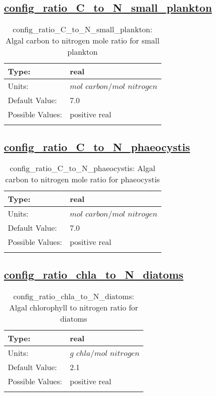 \subsection[config\_ratio\_C\_to\_N\_small\_plankton]{\hyperref[sec:nm_tab_biogeochemistry]{config\_ratio\_C\_to\_N\_small\_plankton}}
\label{subsec:nm_sec_config_ratio_C_to_N_small_plankton}
\begin{center}
\begin{longtable}{| p{2.0in} || p{4.0in} |}
    \hline
    Type: & real \\
    \hline
    Units: & $mol$ $carbon/mol$ $nitrogen$ \\
    \hline
    Default Value: & 7.0 \\
    \hline
    Possible Values: & positive real \\
    \hline
    \caption{config\_ratio\_C\_to\_N\_small\_plankton: Algal carbon to nitrogen mole ratio for small plankton}
\end{longtable}
\end{center}
\subsection[config\_ratio\_C\_to\_N\_phaeocystis]{\hyperref[sec:nm_tab_biogeochemistry]{config\_ratio\_C\_to\_N\_phaeocystis}}
\label{subsec:nm_sec_config_ratio_C_to_N_phaeocystis}
\begin{center}
\begin{longtable}{| p{2.0in} || p{4.0in} |}
    \hline
    Type: & real \\
    \hline
    Units: & $mol$ $carbon/mol$ $nitrogen$ \\
    \hline
    Default Value: & 7.0 \\
    \hline
    Possible Values: & positive real \\
    \hline
    \caption{config\_ratio\_C\_to\_N\_phaeocystis: Algal carbon to nitrogen mole ratio for phaeocystis}
\end{longtable}
\end{center}
\subsection[config\_ratio\_chla\_to\_N\_diatoms]{\hyperref[sec:nm_tab_biogeochemistry]{config\_ratio\_chla\_to\_N\_diatoms}}
\label{subsec:nm_sec_config_ratio_chla_to_N_diatoms}
\begin{center}
\begin{longtable}{| p{2.0in} || p{4.0in} |}
    \hline
    Type: & real \\
    \hline
    Units: & $g$ $chla/mol$ $nitrogen$ \\
    \hline
    Default Value: & 2.1 \\
    \hline
    Possible Values: & positive real \\
    \hline
    \caption{config\_ratio\_chla\_to\_N\_diatoms: Algal chlorophyll to nitrogen ratio for diatoms}
\end{longtable}
\end{center}
